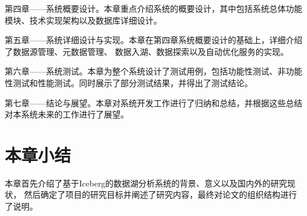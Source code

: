 第四章——系统概要设计。本章重点介绍系统的概要设计，其中包括系统总体功能模块、技术实现架构以及数据库详细设计。

第五章——系统详细设计与实现。本章在第四章系统概要设计的基础上，详细介绍了数据源管理、元数据管理、
数据入湖、数据探索以及自动优化服务的实现。

第六章——系统测试。本章为整个系统设计了测试用例，包括功能性测试、非功能性测试和性能测试。同时展示了部分测试结果，并得出了测试结论。

第七章——结论与展望。本章对系统开发工作进行了归纳和总结，并根据这些总结对本系统未来的工作进行了展望。

\section{本章小结}

本章首先介绍了基于Iceberg的数据湖分析系统的背景、意义以及国内外的研究现状，
然后确定了项目的研究目标并阐述了研究内容，最终对论文的组织结构进行了说明。
